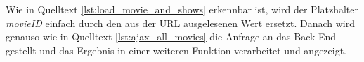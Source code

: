 Wie in Quelltext \vref{lst:load_movie_and_shows} erkennbar ist, wird der Platzhalter \textit{movieID} einfach durch den aus der \acs{URL} ausgelesenen Wert ersetzt.
Danach wird genauso wie in Quelltext \vref{lst:ajax_all_movies} die Anfrage an das Back-End gestellt und das Ergebnis in einer weiteren Funktion verarbeitet und angezeigt.